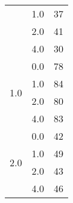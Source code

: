 \begin{longtable}{|c|c|c|c|c|}
    & \multicolumn{2}{c|}{1.0} & \multicolumn{2}{c|}{37} \\
    & \multicolumn{2}{c|}{2.0} & \multicolumn{2}{c|}{41} \\
    & \multicolumn{2}{c|}{4.0} & \multicolumn{2}{c|}{30} \\
    \hline
    \multirow{4}{*}{1.0} & \multicolumn{2}{c|}{0.0} & \multicolumn{2}{c|}{78} \\
    & \multicolumn{2}{c|}{1.0} & \multicolumn{2}{c|}{84} \\
    & \multicolumn{2}{c|}{2.0} & \multicolumn{2}{c|}{80} \\
    & \multicolumn{2}{c|}{4.0} & \multicolumn{2}{c|}{83} \\
    \hline
    \multirow{4}{*}{2.0} & \multicolumn{2}{c|}{0.0} & \multicolumn{2}{c|}{42} \\
    & \multicolumn{2}{c|}{1.0} & \multicolumn{2}{c|}{49} \\
    & \multicolumn{2}{c|}{2.0} & \multicolumn{2}{c|}{43} \\
    & \multicolumn{2}{c|}{4.0} & \multicolumn{2}{c|}{46} \\
    \hline
    \end{longtable}
    
